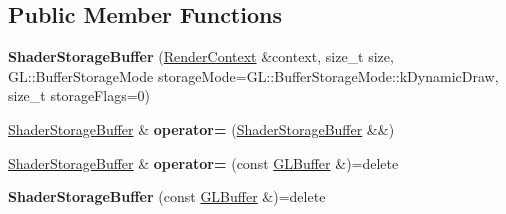 \subsection*{Public Member Functions}
\begin{DoxyCompactItemize}
\item 
\mbox{\label{classrev_1_1_shader_storage_buffer_a1df93ec549041392553ef1f0c736e7f2}} 
{\bfseries Shader\+Storage\+Buffer} (\mbox{\hyperlink{classrev_1_1_render_context}{Render\+Context}} \&context, size\+\_\+t size, G\+L\+::\+Buffer\+Storage\+Mode storage\+Mode=G\+L\+::\+Buffer\+Storage\+Mode\+::k\+Dynamic\+Draw, size\+\_\+t storage\+Flags=0)
\item 
\mbox{\label{classrev_1_1_shader_storage_buffer_a06f596411328c387a1c64141acafb3ba}} 
\mbox{\hyperlink{classrev_1_1_shader_storage_buffer}{Shader\+Storage\+Buffer}} \& {\bfseries operator=} (\mbox{\hyperlink{classrev_1_1_shader_storage_buffer}{Shader\+Storage\+Buffer}} \&\&)
\item 
\mbox{\label{classrev_1_1_shader_storage_buffer_ae63491e7572c15e5f3e5a4c7ad65d35c}} 
\mbox{\hyperlink{classrev_1_1_shader_storage_buffer}{Shader\+Storage\+Buffer}} \& {\bfseries operator=} (const \mbox{\hyperlink{classrev_1_1_g_l_buffer}{G\+L\+Buffer}} \&)=delete
\item 
\mbox{\label{classrev_1_1_shader_storage_buffer_a7de55c90ef846ad3a7e7ced61fbd21fc}} 
{\bfseries Shader\+Storage\+Buffer} (const \mbox{\hyperlink{classrev_1_1_g_l_buffer}{G\+L\+Buffer}} \&)=delete
\end{DoxyCompactItemize}
